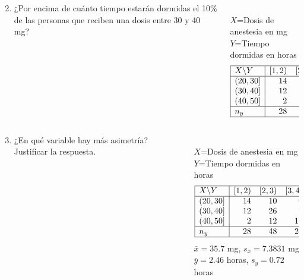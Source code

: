 \documentclass[aspectratio=149,10pt,xcolor=dvipsnames,t]{beamer}
\begin{document}
\begin{frame}
\begin{columns}
\begin{column}[T]{0.55\textwidth}
\begin{enumerate}
\setcounter{enumi}{1}
\item ¿Por encima de cuánto tiempo estarán dormidas el 10\% de las personas que reciben una dosis entre 30 y 40 mg?
\end{enumerate}
\end{column}
\begin{column}[T]{0.45\textwidth}
\\
$X$=Dosis de anestesia en mg\\
$Y$=Tiempo dormidas en horas
\[
\begin{array}{|l|rrr|r|}
\hline 
X\backslash Y & [1,2) & [2,3) & [3,4) & n_x\\
\hline
(20,30] & 14 & 10 & 0 & 24\\
(30,40] & 12 & 26 & 7 & 45\\
(40,50] & 2 & 12 & 17 & 31\\
\hline
n_y & 28 & 48 & 24 & 100\\
\hline
\end{array}
\]
\end{column}
\end{columns}
\end{frame}


\begin{frame}
\begin{columns}
\begin{column}[T]{0.55\textwidth}
\begin{enumerate}
\setcounter{enumi}{2}
\item ¿En qué variable hay más asimetría? Justificar la respuesta.
\end{enumerate}
\end{column}
\begin{column}[T]{0.45\textwidth}
\\
$X$=Dosis de anestesia en mg\\
$Y$=Tiempo dormidas en horas
\[
\begin{array}{|l|rrr|r|}
\hline 
X\backslash Y & [1,2) & [2,3) & [3,4) & n_x\\
\hline
(20,30] & 14 & 10 & 0 & 24\\
(30,40] & 12 & 26 & 7 & 45\\
(40,50] & 2 & 12 & 17 & 31\\
\hline
n_y & 28 & 48 & 24 & 100\\
\hline
\end{array}
\]
$\bar x =35.7$ mg, $s_x=7.3831$ mg\\
$\bar y =2.46$ horas, $s_y=0.72$ horas
\end{column}
\end{columns}
\end{frame}
\end{document}
